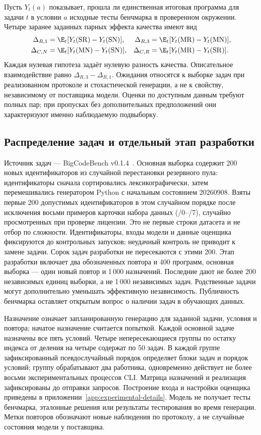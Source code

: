 Пусть $Y_t(a)$ показывает, прошла ли единственная итоговая программа для задачи $t$ в условии $a$ исходные тесты бенчмарка в проверенном окружении. Четыре заранее заданных парных эффекта качества имеют вид
\begin{align}
\Delta_{R,1}&=\E_t[Y_t(\mathrm{SR})-Y_t(\mathrm{SN})], &
\Delta_{R,3}&=\E_t[Y_t(\mathrm{MR})-Y_t(\mathrm{MN})],\\
\Delta_{C,N}&=\E_t[Y_t(\mathrm{MN})-Y_t(\mathrm{SN})], &
\Delta_{C,R}&=\E_t[Y_t(\mathrm{MR})-Y_t(\mathrm{SR})].
\end{align}
Каждая нулевая гипотеза задаёт нулевую разность качества. Описательное взаимодействие равно $\Delta_{R,3}-\Delta_{R,1}$. Ожидания относятся к выборке задач при реализованном протоколе и стохастической генерации, а не к свойству, независимому от поставщика модели. Оценки по доступным данным требуют полных пар; при пропусках без дополнительных предположений они характеризуют именно наблюдаемую подвыборку.

\subsection{Распределение задач и отдельный этап разработки}
Источник задач --- BigCodeBench v0.1.4~\cite{zhuo2024bigcodebench}. Основная выборка содержит 200 новых идентификаторов из случайной перестановки резервного пула: идентификаторы сначала сортировались лексикографически, затем перемешивались генератором Python с начальным состоянием 20260908. Взяты первые 200 допустимых идентификаторов в этом случайном порядке после исключения восьми примеров карточки набора данных (/0--/7), случайно просмотренных при проверке лицензии. Это не первые строки датасета и не отбор по сложности. Идентификаторы, входы модели и данные оценщика фиксируются до контрольных запусков; неудачный контроль не приводит к замене задачи. Сорок задач разработки не пересекаются с этими 200. Этап разработки включает два обозначенных повтора и 400 программ, основная выборка --- один новый повтор и 1\,000 назначений. Последние дают не более 200 независимых единиц выборки, а не 1\,000 независимых задач. Родственные задачи могут дополнительно уменьшать эффективную независимость. Публичность бенчмарка оставляет открытым вопрос о наличии задач в обучающих данных.

Назначение означает запланированную генерацию для заданной задачи, условия и повтора; начатое назначение считается попыткой. Каждой основной задаче назначены все пять условий. Четыре непересекающиеся группы по остатку индекса от деления на четыре содержат по 50 задач. В каждой группе зафиксированный псевдослучайный порядок определяет блоки задач и порядок условий; группу обрабатывают два работника, одновременно действует не более восьми экспериментальных процессов CLI. Матрица назначений и реализация зафиксированы до отправки запросов. Построение входа и настройки оценщика приведены в приложении~\ref{app:experimental-details}. Модель не получает тесты бенчмарка, эталонные решения или результаты тестирования во время генерации. Метки повторов обозначают новые наблюдения по протоколу, а не случайные состояния модели у поставщика.

